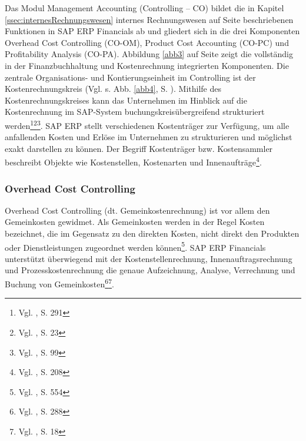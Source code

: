 Das Modul Management Accounting (Controlling -- CO) bildet die in Kapitel \ref{ssec:internesRechnungswesen} internes Rechnungswesen auf Seite \pageref{ssec:internesRechnungswesen} beschriebenen Funktionen in SAP ERP Financials ab und gliedert sich in die drei Komponenten Overhead Cost Controlling (CO-OM), Product Cost Accounting (CO-PC) und Profitability Analysis (CO-PA). Abbildung \ref{abb3} auf Seite \pageref{abb3} zeigt die vollständig in der Finanzbuchhaltung und Kostenrechnung integrierten Komponenten. 
Die zentrale Organisations- und Kontierungseinheit im Controlling ist der Kostenrechnungskreis (Vgl. s. Abb. \ref{abb4}, S. \pageref{abb4}). Mithilfe des Kostenrechnungskreises kann das Unternehmen im Hinblick auf die Kostenrechnung im SAP-System buchungskreisübergreifend strukturiert werden\footnote{Vgl. \cite{Patel2009}, S. 291}\footnote{Vgl. \cite{Friedl2008}, S. 23}\footnote{Vgl. \cite{Klein2010}, S. 99}. SAP ERP stellt verschiedenen Kostenträger zur Verfügung, um alle anfallenden Kosten und Erlöse im Unternehmen zu strukturieren und möglichst exakt darstellen zu können. Der Begriff Kostenträger bzw. Kostensammler beschreibt Objekte wie Kostenstellen, Kostenarten und Innenaufträge\footnote{Vgl. \cite{Patel2009}, S. 208}. 
\subsubsection{Overhead Cost Controlling}
Overhead Cost Controlling (dt. Gemeinkostenrechnung) ist vor allem den Gemeinkosten gewidmet. Als Gemeinkosten werden in der Regel Kosten bezeichnet, die im Gegensatz zu den direkten Kosten, nicht direkt den Produkten oder Dienstleistungen zugeordnet werden können\footnote{Vgl. \cite{Baier2009}, S. 554}. SAP ERP Financials unterstützt überwiegend mit der Kostenstellenrechnung, Innenauftragsrechnung und Prozesskostenrechnung die genaue Aufzeichnung, Analyse, Verrechnung und Buchung von Gemeinkosten\footnote{Vgl. \cite{Patel2009}, S. 288}\footnote{Vgl. \cite{SAPCOOMCCA2001}, S. 18}. 

